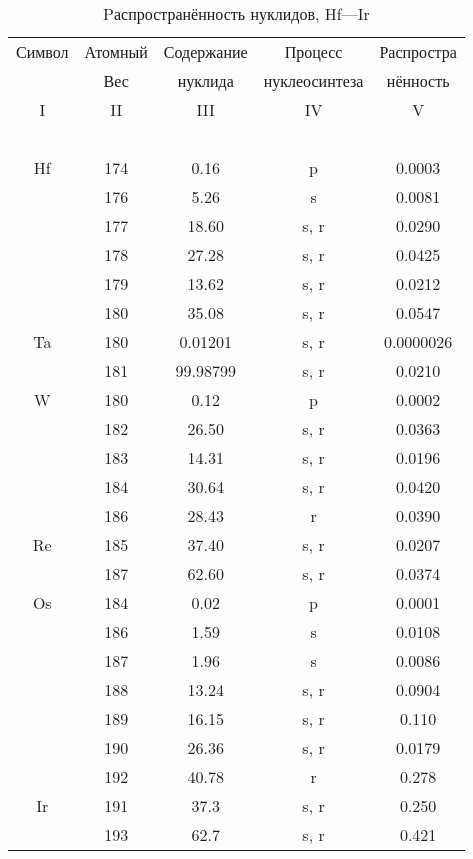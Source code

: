 \documentclass[a5paper,openany]{book}
\begin{document}
\begin{table}[h!]
	{\small
		\begin{tabular}{ccccc}
			Символ  & Атомный &  Содержание  & Процесс & Распростра   \\
			~ & Вес &  нуклида  &  нуклеосинтеза  & нённость  \\
			\hline 
			I & II &  III  & IV & V \\
			\hline 
			~ & ~ & ~ & ~ & ~  \\
			Hf & 174 & 0.16 & p & 0.0003 \\ [1mm]
			& 176 & 5.26 & s & 0.0081\\ [1mm] 
			& 177 &  18.60 & s, r & 0.0290 \\ [1mm]  			
			& 178 & 27.28 & s, r & 0.0425 \\ [1mm]	
			& 179 & 13.62 & s, r & 0.0212 \\ [1mm] 
			& 180 &  35.08 & s, r & 0.0547 \\ [1mm]  	
			Ta & 180 & 0.01201 & s, r & 0.0000026 \\ [1mm]
			& 181 & 99.98799 & s, r & 0.0210 \\ [1mm]
			W & 180 & 0.12 & p & 0.0002 \\ [1mm] 
			& 182 &  26.50 & s, r & 0.0363 \\ [1mm]  			
			& 183 & 14.31 & s, r & 0.0196 \\ [1mm]	
			& 184 &  30.64 & s, r & 0.0420 \\ [1mm]  	
			& 186 &  28.43 & r & 0.0390 \\ [1mm]  
			Re & 185 & 37.40 & s, r & 0.0207 \\ [1mm]
			& 187 & 62.60 & s, r & 0.0374 \\ [1mm]
			Os & 184 & 0.02 & p & 0.0001 \\ [1mm] 
			& 186 &  1.59 & s & 0.0108 \\ [1mm]  			
			& 187 & 1.96 & s & 0.0086 \\ [1mm]	
			& 188 &  13.24 & s, r & 0.0904 \\ [1mm]  	
			& 189 &  16.15 & s, r & 0.110 \\ [1mm] 
			& 190 &  26.36 & s, r & 0.0179 \\ [1mm]  
			& 192 & 40.78 & r & 0.278 \\ [1mm]
			Ir & 191 & 37.3 & s, r & 0.250 \\ [1mm] 
			& 193 &  62.7 & s, r & 0.421 \\ [1mm]
			\hline 
		\end{tabular}
	}
	\caption{Pаспространённость нуклидов, Hf---Ir}
	\label{t:AbudanceSolarHfIr}
\end{table}
\end{document}
